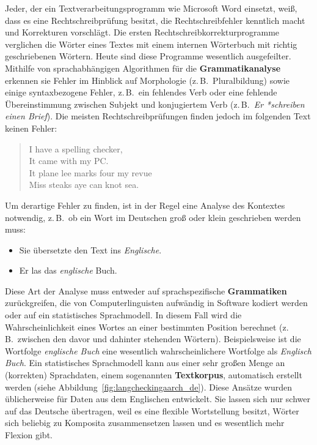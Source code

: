 \documentclass[]{../../metanetpaper}
\begin{document}
\begin{multicols}{2}
Jeder, der ein Textverarbeitungsprogramm wie Microsoft Word einsetzt, weiß, dass es eine Rechtschreibprüfung besitzt, die Rechtschreibfehler kenntlich macht und Korrekturen vorschlägt. Die ersten Rechtschreibkorrekturprogramme verglichen die Wörter eines Textes mit einem internen Wörterbuch mit richtig geschriebenen Wörtern. Heute sind diese Programme wesentlich ausgefeilter. Mithilfe von sprachabhängigen Algorithmen für die \textbf{Grammatikanalyse} erkennen sie Fehler im Hinblick auf Morphologie (z.\,B.~Pluralbildung) sowie einige syntaxbezogene Fehler, z.\,B.~ein fehlendes Verb oder eine fehlende Übereinstimmung zwischen Subjekt und konjugiertem Verb (z.\,B.~\textit{Er *schreiben einen Brief}). Die meisten Rechtschreibprüfungen finden jedoch im folgenden Text \cite{zar1} keinen Fehler:

\begin{quote}
  I have a spelling checker,\\
  It came with my PC.\\
  It plane lee marks four my revue\\
  Miss steaks aye can knot sea.
\end{quote}

Um derartige Fehler zu finden, ist in der Regel eine Analyse des Kontextes notwendig, z.\,B.~ob ein Wort im Deutschen groß oder klein geschrieben werden muss:

\begin{itemize}
\item Sie übersetzte den Text ins \textit{Englische}.
\item Er las das \textit{englische} Buch.
\end{itemize}

Diese Art der Analyse muss entweder auf sprachspezifische \textbf{Grammatiken} zurückgreifen, die von Computerlinguisten aufwändig in Software kodiert werden oder auf ein statistisches Sprachmodell. In diesem Fall wird die Wahrscheinlichkeit eines Wortes an einer bestimmten Position berechnet (z.\,B.~zwischen den davor und dahinter stehenden Wörtern). Beispielsweise ist die Wortfolge \textit{englische Buch} eine wesentlich wahrscheinlichere Wortfolge als \textit{Englisch Buch}. Ein statistisches Sprachmodell kann aus einer sehr großen Menge an (korrekten) Sprachdaten, einem sogenannten \textbf{Textkorpus}, automatisch erstellt werden (siehe Abbildung~\ref{fig:langcheckingaarch_de}). Diese Ansätze wurden üblicherweise für Daten aus dem Englischen entwickelt. Sie lassen sich nur schwer auf das Deutsche übertragen, weil es eine flexible Wortstellung besitzt, Wörter sich beliebig zu Komposita zusammensetzen lassen und es wesentlich mehr Flexion gibt.


\end{multicols}
\end{document}
